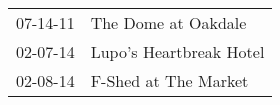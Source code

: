\begin{supertabular}{p{0.25\columnwidth}p{0.75\columnwidth}}
 07-14-11 &      The Dome at Oakdale \\
 02-07-14 &  Lupo's Heartbreak Hotel \\
 02-08-14 &     F-Shed at The Market \\
\end{supertabular}
